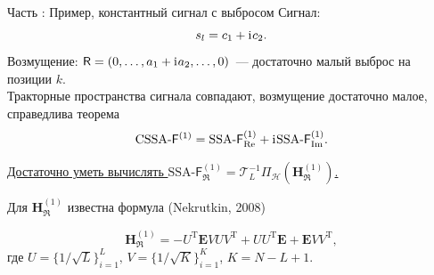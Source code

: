 \documentclass[10pt, ucs, notheorems, handout]{beamer}
\newcommand{\tX}[1]{\mathsf{#1}}
\newcommand{\iu}{\mathrm{i}\mkern1mu}
\newcommand{\RomanNumeralCaps}[1]
{\MakeUppercase{\romannumeral #1}}
\begin{document}
\begin{frame}{Часть \RomanNumeralCaps{2}: Пример, константный сигнал с выбросом}
\alert{Сигнал:}
$$s_l = c_1 + \iu c_2.$$
\alert{Возмущение:} $\tX{R} = (0, \ldots, a_1 + \iu a_2, \ldots, 0)$~--- достаточно малый выброс на позиции $k$.\\
\vspace{1em}
Тракторные пространства сигнала совпадают, возмущение достаточно малое, справедлива теорема $$\text{CSSA-}\tX{F}^{(1)} = \text{SSA-}\tX{F}^{(1)}_{\Re} + \iu\text{SSA-}\tX{F}^{(1)}_{\Im}.$$

\vspace{1em}
\underline{Достаточно уметь вычислять $\text{SSA-}\tX{F}^{(1)}_{\Re} = \mathcal{T}_L^{-1} \Pi_{\mathcal{H}}(\mathbf{H}^{(1)}_{\Re})$.}

\vspace{1em}
Для $\mathbf{H}^{(1)}_{\Re}$ известна формула (Nekrutkin, 2008)

$$\mathbf{H}^{(1)}_{\Re} = -U^{\mathrm{T}} \mathbf{E} V U V^{\mathrm{T}} + U U^{\mathrm{T}} \mathbf{E} + \mathbf{E} V V^{\mathrm{T}},$$
где $U = \{1/\sqrt{L}\}^{L}_{i = 1},\, V = \{1/\sqrt{K}\}^{K}_{i = 1}$, $K = N - L + 1$.

\end{frame}
\end{document}
